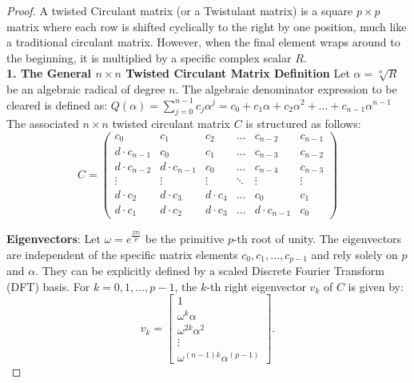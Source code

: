\begin{proof}
A twisted Circulant matrix (or a Twistulant matrix) is a square $p \times p$ matrix where each row is shifted cyclically to the right by one position, much like a traditional circulant matrix. 
However, when the final element wraps around to the beginning, it is multiplied by a specific complex scalar $R$. \\


{\bf 1. The General \(n \times n\) Twisted Circulant Matrix Definition}
Let \(\alpha = \sqrt[n]{R}\) be an algebraic radical of degree \(n\). 
The algebraic denominator expression to be cleared is defined as:
\(Q(\alpha )=\sum _{j=0}^{n-1}c_{j}\alpha ^{j}=c_{0}+c_{1}\alpha +c_{2}\alpha ^{2}+\dots +c_{n-1}\alpha ^{n-1}\)
The associated \(n \times n\) twisted circulant matrix \(C\) is structured as follows:
\[C=\left(\begin{matrix}c_{0}&c_{1}&c_{2}&\dots &c_{n-2}&c_{n-1}\\ 
d\cdot c_{n-1}&c_{0}&c_{1}&\dots &c_{n-3}&c_{n-2}                     \\ 
d\cdot c_{n-2}&d\cdot c_{n-1}&c_{0}&\dots &c_{n-4}&c_{n-3}      \\ 
\vdots &\vdots &\vdots &\ddots &\vdots &\vdots                           \\ d\cdot c_{2}&d\cdot c_{3}&d\cdot c_{4}&\dots &c_{0}&c_{1}\\
 d\cdot c_{1}&d\cdot c_{2}&d\cdot c_{3}&\dots &d\cdot c_{n-1}&c_{0}
 \end{matrix}\right)\] 

{\bf Eigenvectors}:
Let \(\omega = e^{\frac{2\pi i}{p}}\) be the primitive \(p\)-th root of unity.
The eigenvectors are independent of the specific matrix elements \(c_0, c_1, \dots, c_{p-1}\) and rely solely on \(p\) and \( \alpha \).
They can be explicitly defined by a scaled Discrete Fourier Transform (DFT) basis.
For \(k = 0, 1, \dots, p-1\), the \(k\)-th right eigenvector \(v_{k}\) of \(C\) is given by:
\[v_k = \begin{bmatrix}  1 \\  \omega^{k} \alpha  \\  \omega^{2k} \alpha^{2} \\  \vdots \\  \omega^{(n-1)k} \alpha^{(p-1)}  \end{bmatrix}. \]


\end{proof}
